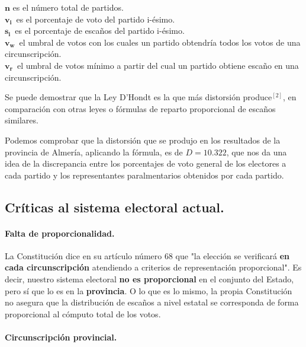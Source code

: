 \documentclass[11pt]{article}
\begin{document}
	  $\boldsymbol{n}$ es el número total de partidos.\\
  $\displaystyle \boldsymbol{v_{i}}\,$  es el porcentaje de voto del partido i-ésimo.\\
  $\displaystyle \boldsymbol{s_{i}}\,$  es el porcentaje de escaños del partido i-ésimo.\\
  $\displaystyle \boldsymbol{v_{w}}\,$  el umbral de votos con los cuales un partido obtendría todos los votos de una circunscripción.\\
  $\displaystyle \boldsymbol{v_{r}}\,$  el umbral de votos mínimo a partir del cual un partido obtiene escaño en una circunscripción.
	 
	 Se puede demostrar que la Ley D'Hondt es la que más distorsión produce$^{[2]}$, en comparación con otras leyes o fórmulas de reparto proporcional de escaños similares.
	 
	 Podemos comprobar que la distorsión que se produjo en los resultados de la provincia de Almería, aplicando la fórmula, es de $D = 10.322$, que nos da una idea de la discrepancia entre los porcentajes de voto general de los electores a cada partido y los representantes paralmentarios obtenidos por cada partido.
	

	\subsection{Críticas al sistema electoral actual.}
	
	\paragraph{Falta de proporcionalidad.}
	
	La Constitución dice en su artículo número 68 que "la elección se verificará \textbf{en cada circunscripción} atendiendo a criterios de representación proporcional". Es decir, nuestro sistema electoral \textbf{no es proporcional} en el conjunto del Estado, pero sí que lo es en la \textbf{provincia}. O lo que es lo mismo, la propia Constitución no asegura que la distribución de escaños a nivel estatal se corresponda de forma proporcional al cómputo total de los votos.
	
	\paragraph{Circunscripción provincial.}
	
\end{document}
